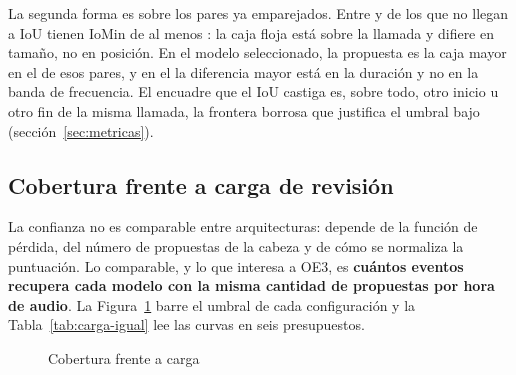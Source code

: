La segunda forma es sobre los pares ya emparejados. Entre
\rLooseContainedMin{} y \rLooseContainedMax{} de los que no llegan a IoU
\pStrictIou{} tienen IoMin de al menos \pContainedIomin{}: la caja floja está
sobre la llamada y difiere en tamaño, no en posición. En el modelo seleccionado,
la propuesta es la caja mayor en el \rContainedLargerYol{} de esos pares, y en el
\rContainedLongerYol{} la diferencia mayor está en la duración y no en la banda
de frecuencia. El encuadre que el IoU castiga es, sobre todo, otro inicio u otro
fin de la misma llamada, la frontera borrosa que justifica el umbral bajo
(sección~\ref{sec:metricas}).

\subsection{Cobertura frente a carga de revisión}
\label{sec:carga-igual}

La confianza no es comparable entre arquitecturas: depende de la función de
pérdida, del número de propuestas de la cabeza y de cómo se normaliza la
puntuación. Lo comparable, y lo que interesa a OE3, es \textbf{cuántos eventos
recupera cada modelo con la misma cantidad de propuestas por hora de audio}. La
Figura~\ref{fig:carga} barre el umbral de cada configuración y la
Tabla~\ref{tab:carga-igual} lee las curvas en seis presupuestos.

\begin{figure}[htbp]
    \centering
    \caption{Cobertura frente a carga}
    \label{fig:carga}
\end{figure}

